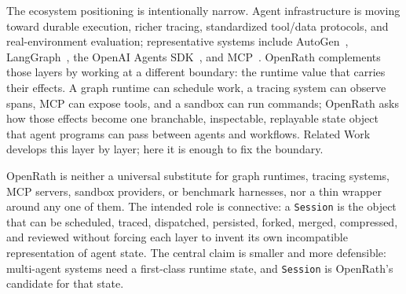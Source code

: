 
The ecosystem positioning is intentionally narrow. Agent infrastructure is
moving toward durable execution, richer tracing, standardized tool/data
protocols, and real-environment evaluation; representative systems include
AutoGen~\cite{autogen}, LangGraph~\cite{langgraph-persistence}, the OpenAI
Agents SDK~\cite{openai-agents-tracing}, and MCP~\cite{mcp-docs,anthropic-mcp}.
OpenRath complements those layers by working at a different boundary: the
runtime value that carries their effects. A graph runtime can schedule work, a
tracing system can observe spans, MCP can expose tools, and a sandbox can run
commands; OpenRath asks how those effects become one branchable, inspectable,
replayable state object that agent programs can pass between agents and
workflows. Related Work develops this layer by layer; here it is enough to fix
the boundary.

OpenRath is neither a universal substitute for graph runtimes, tracing systems, MCP servers, sandbox providers, or benchmark harnesses, nor a thin wrapper around any one of them. The intended role is connective: a \texttt{Session} is the object that can
be scheduled, traced, dispatched, persisted, forked, merged, compressed, and
reviewed without forcing each layer to invent its own incompatible
representation of agent state. The central claim is smaller and more defensible:
multi-agent systems need a first-class runtime state, and \texttt{Session} is
OpenRath's candidate for that state.
